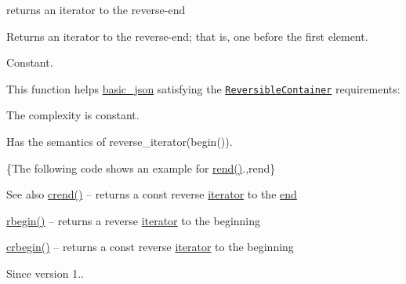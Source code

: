 returns an iterator to the reverse-\/end 

Returns an iterator to the reverse-\/end; that is, one before the first element.

  Constant.

This function helps {\ttfamily \hyperlink{classnlohmann_1_1basic__json}{basic\+\_\+json}} satisfying the \href{https://en.cppreference.com/w/cpp/named_req/ReversibleContainer}{\tt Reversible\+Container} requirements\+:
\begin{DoxyItemize}
\item The complexity is constant.
\item Has the semantics of {\ttfamily reverse\+\_\+iterator(begin())}.
\end{DoxyItemize}

\{The following code shows an example for {\ttfamily \hyperlink{classnlohmann_1_1basic__json_a7a328b29b290cc300345376c54f618cb}{rend()}}.,rend\}

\begin{DoxySeeAlso}{See also}
\hyperlink{classnlohmann_1_1basic__json_a223480466a0922267d680ec8f0722d58}{crend()} -- returns a const reverse \hyperlink{classnlohmann_1_1basic__json_aa549b2b382916b3baafb526e5cb410bd}{iterator} to the \hyperlink{classnlohmann_1_1basic__json_a931267ec3f09eb67e4382f321b2c52bc}{end} 

\hyperlink{classnlohmann_1_1basic__json_aff8e38cd973bc94557fa8d36433c0e4c}{rbegin()} -- returns a reverse \hyperlink{classnlohmann_1_1basic__json_aa549b2b382916b3baafb526e5cb410bd}{iterator} to the beginning 

\hyperlink{classnlohmann_1_1basic__json_a044298d189bdf7e4b36492de9811ddd6}{crbegin()} -- returns a const reverse \hyperlink{classnlohmann_1_1basic__json_aa549b2b382916b3baafb526e5cb410bd}{iterator} to the beginning
\end{DoxySeeAlso}
\begin{DoxySince}{Since}
version 1.. 
\end{DoxySince}
